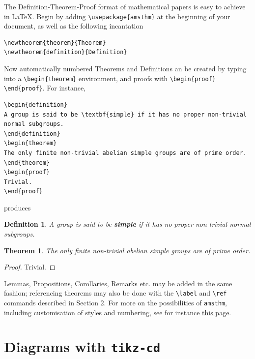 \documentclass[11pt]{article}
\newtheorem{definition}{Definition}
\newtheorem{theorem}{Theorem}
\begin{document}
The Definition-Theorem-Proof format of mathematical papers is easy to achieve in \LaTeX. Begin by adding \verb$\usepackage{amsthm}$ at the beginning of your document, as well as the following incantation
\begin{verbatim}
\newtheorem{theorem}{Theorem}
\newtheorem{definition}{Definition}
\end{verbatim}
Now automatically numbered Theorems and Definitions an be created by typing into a \verb$\begin{theorem}$ environment, and proofs with \verb$\begin{proof} \end{proof}$. For instance,
\begin{verbatim}
\begin{definition}
A group is said to be \textbf{simple} if it has no proper non-trivial normal subgroups. 
\end{definition}
\begin{theorem}
The only finite non-trivial abelian simple groups are of prime order.
\end{theorem}
\begin{proof}
Trivial.
\end{proof}
\end{verbatim}
produces
\begin{definition}
A group is said to be \textbf{simple} if it has no proper non-trivial normal subgroups. 
\end{definition}
\begin{theorem}
The only finite non-trivial abelian simple groups are of prime order.
\end{theorem}
\begin{proof}
Trivial.
\end{proof}

Lemmas, Propositions, Corollaries, Remarks etc. may be added in the same fashion; referencing theorems may also be done with the \verb$\label$ and \verb$\ref$ commands described in Section 2. For more on the possibilities of \texttt{amsthm}, including customisation of styles and numbering, see for instance \href{https://en.wikibooks.org/wiki/LaTeX/Theorems}{this page}.

\section{Diagrams with \texttt{tikz-cd}}
\end{document}
